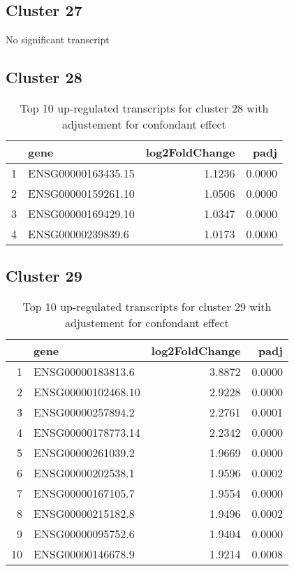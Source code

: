 \documentclass{article}
\begin{document}
\subsection{Cluster 27 }
No significant transcript
\subsection{Cluster 28 }
\begin{table}[H]
\centering
\begin{tabularx}{\textwidth}{rlrr}
  \hline
 & gene & log2FoldChange & padj \\ 
  \hline
1 & ENSG00000163435.15 & 1.1236 & 0.0000 \\ 
  2 & ENSG00000159261.10 & 1.0506 & 0.0000 \\ 
  3 & ENSG00000169429.10 & 1.0347 & 0.0000 \\ 
  4 & ENSG00000239839.6 & 1.0173 & 0.0000 \\ 
   \hline
\end{tabularx}
\caption{Top 10 up-regulated transcripts for cluster 28 with adjustement for confondant effect} 
\label{tab:q3_1_conf_28}
\end{table}
\subsection{Cluster 29 }
\begin{table}[H]
\centering
\begin{tabularx}{\textwidth}{rlrr}
  \hline
 & gene & log2FoldChange & padj \\ 
  \hline
1 & ENSG00000183813.6 & 3.8872 & 0.0000 \\ 
  2 & ENSG00000102468.10 & 2.9228 & 0.0000 \\ 
  3 & ENSG00000257894.2 & 2.2761 & 0.0001 \\ 
  4 & ENSG00000178773.14 & 2.2342 & 0.0000 \\ 
  5 & ENSG00000261039.2 & 1.9669 & 0.0000 \\ 
  6 & ENSG00000202538.1 & 1.9596 & 0.0002 \\ 
  7 & ENSG00000167105.7 & 1.9554 & 0.0000 \\ 
  8 & ENSG00000215182.8 & 1.9496 & 0.0002 \\ 
  9 & ENSG00000095752.6 & 1.9404 & 0.0000 \\ 
  10 & ENSG00000146678.9 & 1.9214 & 0.0008 \\ 
   \hline
\end{tabularx}
\caption{Top 10 up-regulated transcripts for cluster 29 with adjustement for confondant effect} 
\label{tab:q3_1_conf_29}
\end{table}
\end{document}
